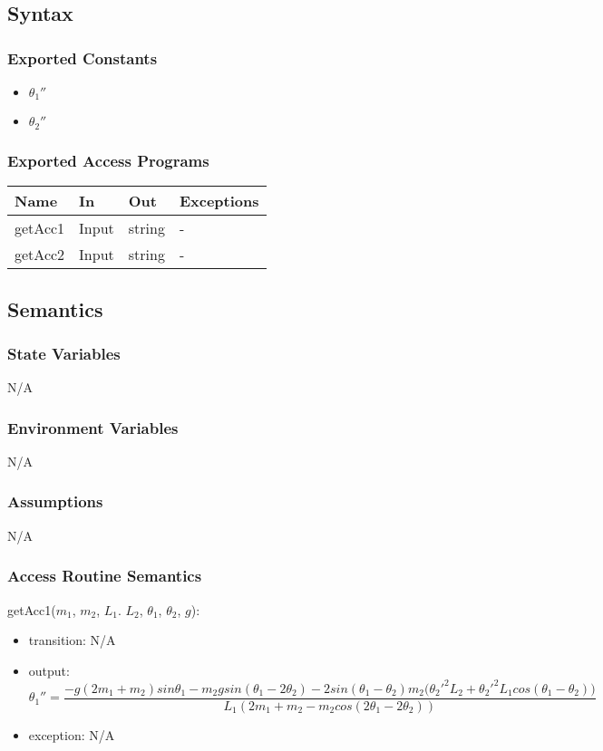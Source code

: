 \documentclass[12pt, titlepage]{article}
\begin{document}
\subsection{Syntax}

\subsubsection{Exported Constants}
\begin{itemize}
  \item ${\theta_1}''$
  \item ${\theta_2}''$
\end{itemize}

\subsubsection{Exported Access Programs}

\begin{center}
\begin{tabular}{p{4cm} p{2cm} p{2cm} p{4cm}}
\hline
\textbf{Name} & \textbf{In} & \textbf{Out} & \textbf{Exceptions} \\
\hline
getAcc1 & Input & string & - \\
\hline
getAcc2 & Input & string & - \\
\hline
\end{tabular}
\end{center}

\subsection{Semantics}

\subsubsection{State Variables}
N/A
\subsubsection{Environment Variables}
N/A
\subsubsection{Assumptions}
N/A
\subsubsection{Access Routine Semantics}

\noindent getAcc1($m_1$, $m_2$, $L_1$. $L_2$, $\theta_1$, $\theta_2$, $g$):
\begin{itemize}
\item transition: N/A 
\item output: 
\[{\theta_1}''=\frac{-g(2m_1+m_2)sin\theta_1-m_2gsin(\theta_1-2\theta_2)-2sin(\theta_1-\theta_2)m_2({{\theta_2}'}^2L_2+{{\theta_2}'}^2L_1cos(\theta_1-\theta_2)\big)}{L_1(2m_1+m_2-m_2cos(2\theta_1-2\theta_2))}\]
\item exception: N/A
\end{itemize}
\end{document}
